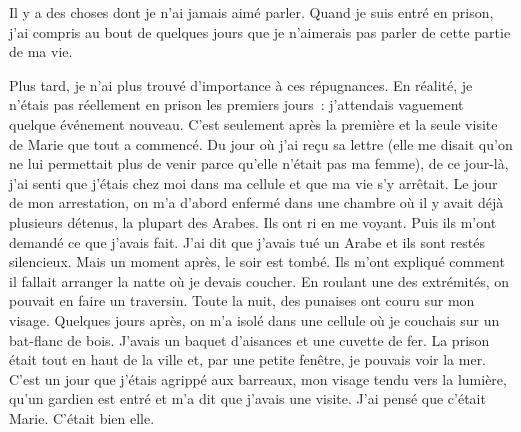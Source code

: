 \documentclass[french,twoside]{book} %
\newcommand\chaptercont{} %
\begin{document}
\chaptercont
\noindent Il y a des choses dont je n’ai jamais aimé parler. Quand je suis entré en prison, j’ai compris au bout de quelques jours que je n’aimerais pas parler de cette partie de ma vie.\par
Plus tard, je n’ai plus trouvé d’importance à ces répugnances. En réalité, je n’étais pas réellement en prison les premiers jours : j’attendais vaguement quelque événement nouveau. C'est seulement après la première et la seule visite de Marie que tout a commencé. Du jour où j’ai reçu sa lettre (elle me disait qu’on ne lui permettait plus de venir parce qu’elle n’était pas ma femme), de ce jour-là, j’ai senti que j’étais chez moi dans ma cellule et que ma vie s’y arrêtait. Le jour de mon arrestation, on m’a d’abord enfermé dans une chambre où il y avait déjà plusieurs détenus, la plupart des Arabes. Ils ont ri en me voyant. Puis ils m’ont demandé ce que j’avais fait. J'ai dit que j’avais tué un Arabe et ils sont restés silencieux. Mais un moment après, le soir est tombé. Ils m’ont expliqué comment il fallait arranger la natte où je devais coucher. En roulant une des extrémités, on pouvait en faire un traversin. Toute la nuit, des punaises ont couru sur mon visage. Quelques jours après, on m’a isolé dans une cellule où je couchais sur un bat-flanc de bois. J'avais un baquet d’aisances et une cuvette de fer. La prison était tout en haut de la ville et, par une petite fenêtre, je pouvais voir la mer. C'est un jour que j’étais agrippé aux barreaux, mon visage tendu vers la lumière, qu’un gardien est entré et m’a dit que j’avais une visite. J'ai pensé que c’était Marie. C'était bien elle.\par
\end{document}
